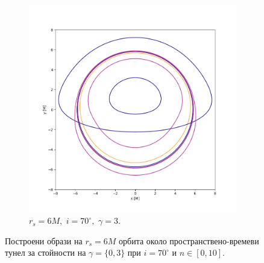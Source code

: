\begin{figure}[!htb]
\begin{subfigure}{6cm}
		\includegraphics[scale = 0.32]{Wh_70_deg_r6_gamma_3.png}
		\caption{$r_s = 6M,\,\, i = 70^\circ,\,\,\gamma = 3$.}
	\end{subfigure}
	\caption[Построени образи на $r_s = 6M$ орбита около пространствено-времеви тунел за различни стойности на $\gamma$ при $i \ 70^\circ$.]{\small Построени образи на $r_s = 6M$ орбита около пространствено-времеви тунел за стойности на $\gamma = \{0, 3\}$ при $i = 70^\circ$ и $n\in[0,10]$.} 
\label{WH_gamma_70_deg}
\end{figure}
